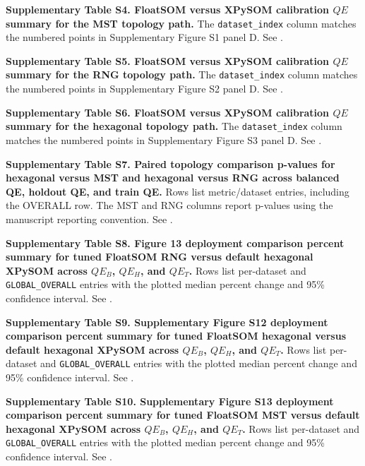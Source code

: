 \documentclass[11pt]{article}
\begin{document}
\textbf{Supplementary Table S4. FloatSOM versus XPySOM calibration $QE$ summary for the MST topology path.} The \texttt{dataset\_index} column matches the numbered points in Supplementary Figure S1 panel D. See .

\textbf{Supplementary Table S5. FloatSOM versus XPySOM calibration $QE$ summary for the RNG topology path.} The \texttt{dataset\_index} column matches the numbered points in Supplementary Figure S2 panel D. See .

\textbf{Supplementary Table S6. FloatSOM versus XPySOM calibration $QE$ summary for the hexagonal topology path.} The \texttt{dataset\_index} column matches the numbered points in Supplementary Figure S3 panel D. See .

\textbf{Supplementary Table S7. Paired topology comparison p-values for hexagonal versus MST and hexagonal versus RNG across balanced QE, holdout QE, and train QE.} Rows list metric/dataset entries, including the OVERALL row. The MST and RNG columns report p-values using the manuscript reporting convention. See .

\textbf{Supplementary Table S8. Figure 13 deployment comparison percent summary for tuned FloatSOM RNG versus default hexagonal XPySOM across $QE_B$, $QE_H$, and $QE_T$.} Rows list per-dataset and \texttt{GLOBAL\_OVERALL} entries with the plotted median percent change and 95\% confidence interval. See .

\textbf{Supplementary Table S9. Supplementary Figure S12 deployment comparison percent summary for tuned FloatSOM hexagonal versus default hexagonal XPySOM across $QE_B$, $QE_H$, and $QE_T$.} Rows list per-dataset and \texttt{GLOBAL\_OVERALL} entries with the plotted median percent change and 95\% confidence interval. See .

\textbf{Supplementary Table S10. Supplementary Figure S13 deployment comparison percent summary for tuned FloatSOM MST versus default hexagonal XPySOM across $QE_B$, $QE_H$, and $QE_T$.} Rows list per-dataset and \texttt{GLOBAL\_OVERALL} entries with the plotted median percent change and 95\% confidence interval. See .
\end{document}
